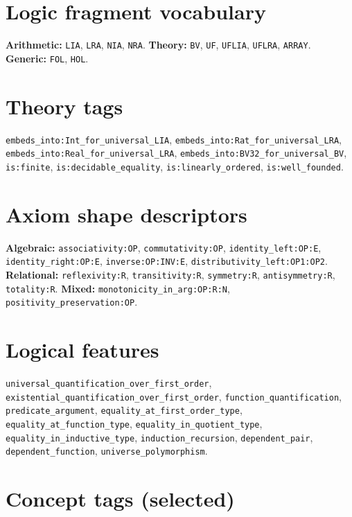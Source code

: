 \documentclass[10pt,letterpaper]{article}
\begin{document}
\section{Logic fragment vocabulary}

\noindent
\textbf{Arithmetic:} \texttt{LIA}, \texttt{LRA}, \texttt{NIA}, \texttt{NRA}.
\quad
\textbf{Theory:} \texttt{BV}, \texttt{UF}, \texttt{UFLIA}, \texttt{UFLRA}, \texttt{ARRAY}.
\quad
\textbf{Generic:} \texttt{FOL}, \texttt{HOL}.

\section{Theory tags}

\noindent
\texttt{embeds\_into:Int\_for\_universal\_LIA},
\texttt{embeds\_into:Rat\_for\_universal\_LRA},
\texttt{embeds\_into:Real\_for\_universal\_LRA},
\texttt{embeds\_into:BV32\_for\_universal\_BV},
\texttt{is:finite},
\texttt{is:decidable\_equality},
\texttt{is:linearly\_ordered},
\texttt{is:well\_founded}.

\section{Axiom shape descriptors}

\noindent
\textbf{Algebraic:} \texttt{associativity:OP},
\texttt{commutativity:OP},
\texttt{identity\_left:OP:E},
\texttt{identity\_right:OP:E},
\texttt{inverse:OP:INV:E},
\texttt{distributivity\_left:OP1:OP2}.
\quad
\textbf{Relational:} \texttt{reflexivity:R},
\texttt{transitivity:R},
\texttt{symmetry:R},
\texttt{antisymmetry:R},
\texttt{totality:R}.
\quad
\textbf{Mixed:} \texttt{monotonicity\_in\_arg:OP:R:N},
\texttt{positivity\_preservation:OP}.

\section{Logical features}

\noindent
\texttt{universal\_quantification\_over\_first\_order},
\texttt{existential\_quantification\_over\_first\_order},
\texttt{function\_quantification},
\texttt{predicate\_argument},
\texttt{equality\_at\_first\_order\_type},
\texttt{equality\_at\_function\_type},
\texttt{equality\_in\_quotient\_type},
\texttt{equality\_in\_inductive\_type},
\texttt{induction\_recursion},
\texttt{dependent\_pair},
\texttt{dependent\_function},
\texttt{universe\_polymorphism}.

\section{Concept tags (selected)}
\end{document}
